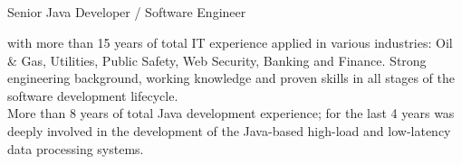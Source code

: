 \documentclass{res}
\newif\ifFullVersion
\begin{document}
\begin{resume}

\section{}
\vspace{8pt} %
\ifFullVersion
\noindent Team Lead / Principal Software Developer
\else
\noindent Senior Java Developer / Software Engineer
\fi
with more than 15 years of total IT experience applied in various industries: Oil \& Gas, Utilities, Public Safety, Web Security, Banking and Finance. Strong engineering background, working knowledge and proven skills in all stages of the software development lifecycle.\\
\ifFullVersion
\indent More than 5~years of team leading experience, able to interact well at all levels and articulate the IT-specific issues to non-IT colleagues in a clear business-transparent way. Praised for the ability to translate the complex functional and non-functional requirements into simple, convenient for implementation and testing architecture.\\
\indent Looking for a challenging role where my skills and qualifications will add value and make a significant contribution to the company.
\else
 \indent More than 8 years of total Java development experience; for the last 4 years was deeply involved in the development of the Java-based high-load and low-latency data processing systems.
\fi


\end{resume}
\end{document}
